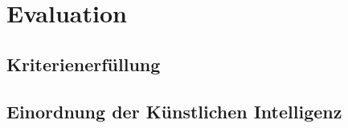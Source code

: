 
\chapter{Evaluation}

\section{Kriterienerfüllung}
\section{Einordnung der Künstlichen Intelligenz}




